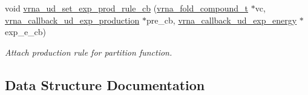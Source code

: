 \begin{DoxyCompactItemize}
void \mbox{\hyperlink{group__domains__up_ga2fb1db2099da26c76247e1209ad4aa09}{vrna\+\_\+ud\+\_\+set\+\_\+exp\+\_\+prod\+\_\+rule\+\_\+cb}} (\mbox{\hyperlink{group__fold__compound_ga1b0cef17fd40466cef5968eaeeff6166}{vrna\+\_\+fold\+\_\+compound\+\_\+t}} $\ast$vc, \mbox{\hyperlink{group__domains__up_ga33d78327dcd04c1ca5ab2887edc18c7b}{vrna\+\_\+callback\+\_\+ud\+\_\+exp\+\_\+production}} $\ast$pre\+\_\+cb, \mbox{\hyperlink{group__domains__up_ga861706f257ba993753464b823e65b86e}{vrna\+\_\+callback\+\_\+ud\+\_\+exp\+\_\+energy}} $\ast$exp\+\_\+e\+\_\+cb)
\begin{DoxyCompactList}\small\item\em Attach production rule for partition function. \end{DoxyCompactList}\end{DoxyCompactItemize}


\subsection{Data Structure Documentation}
\label{structvrna__unstructured__domain__s}
